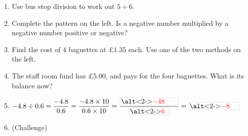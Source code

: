 \documentclass{beamer}
\newcommand{\ashow}[1]{\uncover<2->{\textcolor{red}{\small #1}}}
\newcommand{\abox}[1]{%
  \tikz[baseline=(b.base)]\node[draw=gray, densely dotted, inner sep=1.5pt] (b)
    {\alt<2->{\textcolor{red}{#1}}{\phantom{#1}}};%
}
\newcommand{\tightlist}{%
  \setlength{\itemsep}{0pt}\setlength{\parskip}{0pt}\setlength{\topsep}{0pt}%
}
\begin{document}
\begin{frame}
\begin{columns}[T,onlytextwidth]
\vspace{-1.5em}
\footnotesize
\begin{enumerate}\tightlist
{}
  \item Use bus stop division to work out $5\div6$.
        \ashow{$0.8\dot{3}$}
  \item Complete the pattern on the left. Is a negative number multiplied by a
        negative number positive or negative?
        \ashow{Positive}
  \item Find the cost of $4$ baguettes at £$1.35$ each. Use one of the two methods on
        the left.
        \ashow{£$5.40$}
  \item The staff room fund has £$5.00$, and pays for the four baguettes. What is its
        balance now?
        \ashow{$5.00-5.40=-0.40$, so $-$£$0.40$}
  \item $-4.8\div0.6=\dfrac{-4.8}{0.6}=\dfrac{-4.8\times10}{0.6\times10}
        =\dfrac{\abox{$-48$}}{\abox{$6$}}=\abox{$-8$}$
  \item[] \vspace{3pt}(Challenge)
\end{enumerate}
\end{columns}
\end{frame}
\end{document}
